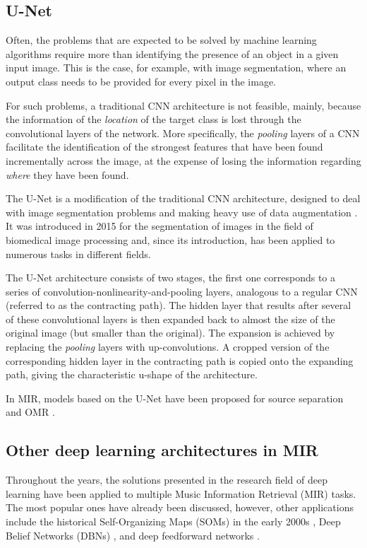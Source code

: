 \subsection{U-Net}
Often, the problems that are expected to be solved by machine learning algorithms require more than identifying the presence of an object in a given input image. This is the case, for example, with image segmentation, where an output class needs to be provided for every pixel in the image.

For such problems, a traditional CNN architecture is not feasible, mainly, because the information of the \emph{location} of the target class is lost through the convolutional layers of the network. More specifically, the \emph{pooling} layers of a CNN facilitate the identification of the strongest features that have been found incrementally across the image, at the expense of losing the information regarding \emph{where} they have been found.

The U-Net is a modification of the traditional CNN architecture, designed to deal with image segmentation problems and making heavy use of data augmentation \cite{ronneberger_u-net:_2015}. It was introduced in 2015 for the segmentation of images in the field of biomedical image processing and, since its introduction, has been applied to numerous tasks in different fields.

The U-Net architecture consists of two stages, the first one corresponds to a series of convolution-nonlinearity-and-pooling layers, analogous to a regular CNN (referred to as the contracting path). The hidden layer that results after several of these convolutional layers is then expanded back to almost the size of the original image (but smaller than the original). The expansion is achieved by replacing the \emph{pooling} layers with up-convolutions. A cropped version of the corresponding hidden layer in the contracting path is copied onto the expanding path, giving the characteristic u-shape of the architecture.

In MIR, models based on the U-Net have been proposed for source separation \cite{jansson_singing_2017, stoller_wave-u-net:_2018} and OMR \cite{hajic_towards_2018}.

\subsection{Other deep learning architectures in MIR}
Throughout the years, the solutions presented in the research field of deep learning have been applied to multiple Music Information Retrieval (MIR) tasks. The most popular ones have already been discussed, however, other applications include the historical Self-Organizing Maps (SOMs) in the early 2000s \cite{kiernan_score-based_2000, harford_automatic_2003}, Deep Belief Networks (DBNs) \cite{hamel_learning_2010, schmidt_learning_2013, chacon_developing_2014, raczynski_multiple_2010, battenberg_analyzing_2012, herwaarden_predicting_2014, zhou_chord_2015}, and deep feedforward networks \cite{cherla_multiple_2014,  liang_content-aware_2015, dawson_key-finding_2018, valk_deep_2018}.


